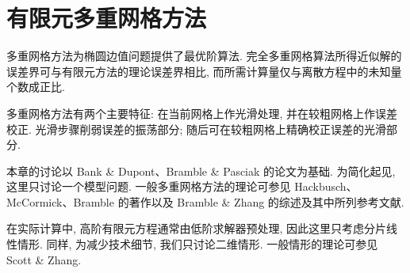 \section{有限元多重网格方法}
\label{chap:ch06-finite-element-multigrid-methods}

多重网格方法为椭圆边值问题提供了最优阶算法. 完全多重网格算法所得近似解的误差界可与有限元方法的理论误差界相比, 而所需计算量仅与离散方程中的未知量个数成正比.

多重网格方法有两个主要特征: 在当前网格上作光滑处理, 并在较粗网格上作误差校正. 光滑步骤削弱误差的振荡部分; 随后可在较粗网格上精确校正误差的光滑部分.

本章的讨论以 Bank \& Dupont、Bramble \& Pasciak 的论文为基础. 为简化起见, 这里只讨论一个模型问题. 一般多重网格方法的理论可参见 Hackbusch、McCormick、Bramble 的著作以及 Bramble \& Zhang 的综述及其中所列参考文献.

在实际计算中, 高阶有限元方程通常由低阶求解器预处理, 因此这里只考虑分片线性情形. 同样, 为减少技术细节, 我们只讨论二维情形. 一般情形的理论可参见 Scott \& Zhang.









